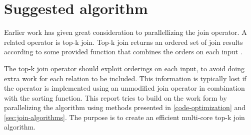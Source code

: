 \section{Suggested algorithm}

Earlier work has given great consideration to parallellizing the join
operator. A related operator is top-k join. Top-k join returns an
ordered set of join results according to some provided function that
combines the orders on each input \cite{topkjoin}.

The top-k join operator should exploit orderings on each input, to
avoid doing extra work for each relation to be included. This
information is typically lost if the operator is implemented using an
unmodified join operator in combination with the sorting function.
This report tries to build on the work form \cite{topkjoin} by
parallelizing the algorithm using methods presented in
\ref{code-optimization} and \ref{sec:join-algorithms}. The
purpose is to create an efficient multi-core top-k join algorithm.
